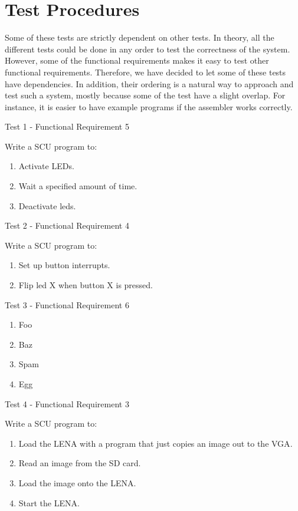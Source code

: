 \section{Test Procedures}

Some of these tests are strictly dependent on other tests. In theory, all the
different tests could be done in any order to test the correctness of the
system. However, some of the functional requirements makes it easy to test other
functional requirements. Therefore, we have decided to let some of these tests
have dependencies. In addition, their ordering is a natural way to approach and
test such a system, mostly because some of the test have a slight overlap. For
instance, it is easier to have example programs if the assembler works
correctly.

{\sc Test 1 - Functional Requirement 5}

{\em \FRV}

Write a \ac{SCU} program to:
\begin{enumerate}
\item Activate \acp{LED}.
\item Wait a specified amount of time.
\item Deactivate leds.
\end{enumerate}

{\sc Test 2 - Functional Requirement 4}

{\em \FRIV}

Write a \ac{SCU} program to:
\begin{enumerate}
\item Set up button interrupts.
\item Flip led X when button X is pressed.
\end{enumerate}

{\sc Test 3 - Functional Requirement 6}

{\em \FRVI}

\begin{enumerate}
\item Foo
\item Baz
\item Spam
\item Egg
\end{enumerate}

{\sc Test 4 - Functional Requirement 3}

{\em \FRIII}

Write a \ac{SCU} program to:
\begin{enumerate}
\item Load the \ac{LENA} with a program that just copies an image out to the
  \ac{VGA}.
\item Read an image from the \ac{SD} card.
\item Load the image onto the \ac{LENA}.
\item Start the \ac{LENA}.
\end{enumerate}

